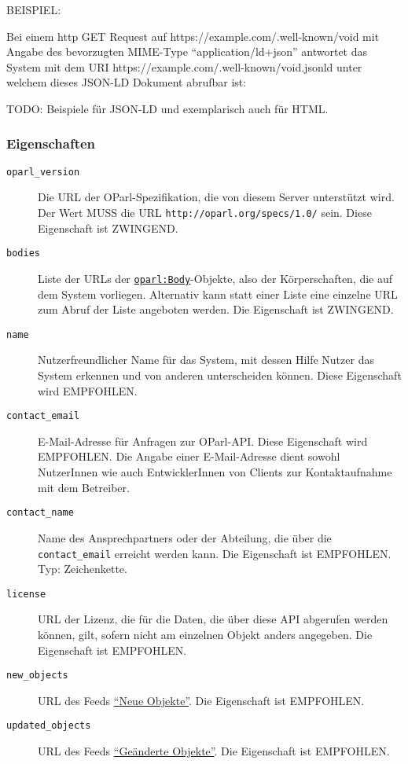 \documentclass[,a4paper]{article}
\begin{document}
BEISPIEL:

Bei einem http GET Request auf https://example.com/.well-known/void mit
Angabe des bevorzugten MIME-Type ``application/ld+json'' antwortet das
System mit dem URI https://example.com/.well-known/void.jsonld unter
welchem dieses JSON-LD Dokument abrufbar ist:

TODO: Beispiele für JSON-LD und exemplarisch auch für HTML.

\subsubsection{Eigenschaften}\label{eigenschaften}

\begin{description}
\item[\texttt{oparl\_version}]
Die URL der OParl-Spezifikation, die von diesem Server unterstützt wird.
Der Wert MUSS die URL \texttt{http://oparl.org/specs/1.0/} sein. Diese
Eigenschaft ist ZWINGEND.
\item[\texttt{bodies}]
Liste der URLs der
\hyperref[oparlux5fbody]{\texttt{oparl:Body}}-Objekte, also der
Körperschaften, die auf dem System vorliegen. Alternativ kann statt
einer Liste eine einzelne URL zum Abruf der Liste angeboten werden. Die
Eigenschaft ist ZWINGEND.
\item[\texttt{name}]
Nutzerfreundlicher Name für das System, mit dessen Hilfe Nutzer das
System erkennen und von anderen unterscheiden können. Diese Eigenschaft
wird EMPFOHLEN.
\item[\texttt{contact\_email}]
E-Mail-Adresse für Anfragen zur OParl-API. Diese Eigenschaft wird
EMPFOHLEN. Die Angabe einer E-Mail-Adresse dient sowohl NutzerInnen wie
auch EntwicklerInnen von Clients zur Kontaktaufnahme mit dem Betreiber.
\item[\texttt{contact\_name}]
Name des Ansprechpartners oder der Abteilung, die über die
\texttt{contact\_email} erreicht werden kann. Die Eigenschaft ist
EMPFOHLEN. Typ: Zeichenkette.
\item[\texttt{license}]
URL der Lizenz, die für die Daten, die über diese API abgerufen werden
können, gilt, sofern nicht am einzelnen Objekt anders angegeben. Die
Eigenschaft ist EMPFOHLEN.
\item[\texttt{new\_objects}]
URL des Feeds \hyperref[feedux5fneueux5fobjekte]{``Neue Objekte''}. Die
Eigenschaft ist EMPFOHLEN.
\item[\texttt{updated\_objects}]
URL des Feeds \hyperref[feedux5fgeaenderteux5fobjekte]{``Geänderte
Objekte''}. Die Eigenschaft ist EMPFOHLEN.

\end{description}
\end{document}
